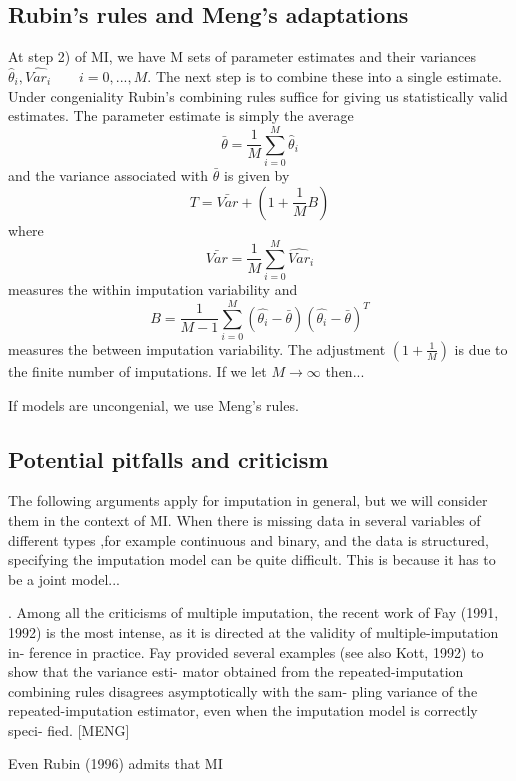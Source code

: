 \documentclass{article}
\begin{document}
	\subsection{Rubin's rules and Meng's adaptations}
	
	At step 2) of MI, we have M sets of parameter estimates and their variances $\hat{\theta}_{i},\hat{Var_{i}} \qquad i=0,...,M$. The next step is to combine these into a single estimate. Under congeniality Rubin's combining rules suffice for giving us statistically valid estimates. The parameter estimate is simply the average $$\bar{\theta} = \frac{1}{M}\sum_{i=0}^{M}\hat{\theta}_{i}$$ and the variance associated with $\bar{\theta}$ is given by $$T = \bar{Var}+(1+\frac{1}{M}B)$$ where $$\bar{Var} = \frac{1}{M}\sum_{i=0}^{M}\hat{Var}_{i}$$ measures the within imputation variability and $$B = \frac{1}{M-1}\sum_{i=0}^{M}(\hat{\theta_{i}}-\bar{\theta})(\hat{\theta_{i}}-\bar{\theta})^{T}$$ measures the between imputation variability. The adjustment $(1+\frac{1}{M})$ is due to the finite number of imputations. If we let $M\rightarrow\infty$ then...
	
	
	
	
	
	If models are uncongenial, we use Meng's rules.
	
	\subsection{Potential pitfalls and criticism}
	The following arguments apply for imputation in general, but we will consider them in the context of MI. When there is missing data in several variables of different types ,for example continuous and binary, and the data is structured, specifying the imputation model can be quite difficult. This is because it has to be a joint model...
	
	
	. Among all the
	criticisms of multiple imputation, the recent work
	of Fay (1991, 1992) is the most intense, as it is
	directed at the validity of multiple-imputation in-
	ference in practice. Fay provided several examples
	(see also Kott, 1992) to show that the variance esti-
	mator obtained from the repeated-imputation combining rules disagrees asymptotically with the sam-
	pling variance of the repeated-imputation estimator,
	even when the imputation model is correctly speci-
	fied. [MENG]
	
	
	Even Rubin (1996) admits that MI
	
\end{document}
